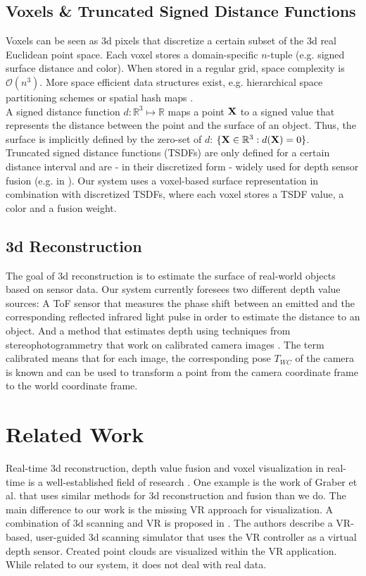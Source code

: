 \documentclass[conference]{IEEEtran}
\newcommand{\sco}[1]{\uppercase{\mathbf{#1}}}
\begin{document}
\subsection {Voxels \& Truncated Signed Distance Functions}
Voxels can be seen as 3d pixels that discretize a certain subset of the 3d real Euclidean point space. 
Each voxel stores a domain-specific $n$-tuple (e.g. signed surface distance and color).
When stored in a regular grid, space complexity is $\mathcal{O}(n^3)$. 
More space efficient data structures exist, e.g. hierarchical space partitioning schemes or spatial hash maps \cite{Niessner2013}. 
\\
A signed distance function $d: \mathbb{R}^3 \mapsto \mathbb{R}$ maps a point $\sco{x}$ to a signed value that represents the distance between the point and the surface of an object. 
Thus, the surface is implicitly defined by the zero-set of $d$: $\{\sco{x} \in \mathbb{R}^3 : d(\sco{x})=0\}$.
\\
Truncated signed distance functions (TSDFs) are only defined for a certain distance interval and are - in their discretized form - widely used for depth sensor fusion (e.g. in \cite{Graber2011}).
Our system uses a voxel-based surface representation in combination with discretized TSDFs, where each voxel stores a TSDF value, a color and a fusion weight.    

\subsection {3d Reconstruction}
The goal of 3d reconstruction is to estimate the surface of real-world objects based on sensor data. 
Our system currently foresees two different depth value sources: 
A ToF sensor that measures the phase shift between an emitted and the corresponding reflected infrared light pulse in order to estimate the distance to an object. 
And a method that estimates depth using techniques from stereophotogrammetry that work on calibrated camera images \cite{Seitz2006}. 
The term calibrated means that for each image, the corresponding pose $T_{WC}$ of the camera is known and can be used to transform a point from the camera coordinate frame to the world coordinate frame.

\section{Related Work}
Real-time 3d reconstruction, depth value fusion and voxel visualization in real-time is a well-established field of research \cite{Graber2011,Steinbruecker13,fuhrmann2011}. 
One example is the work of Graber et al. \cite{Graber2011} that uses similar methods for 3d reconstruction and fusion than we do. 
The main difference to our work is the missing VR approach for visualization. 
A combination of 3d scanning and VR is proposed in \cite{danhof2015}. 
The authors describe a VR-based, user-guided 3d scanning simulator that uses the VR controller as a virtual depth sensor. 
Created point clouds are visualized within the VR application.
While related to our system, it does not deal with real data. 
\end{document}
